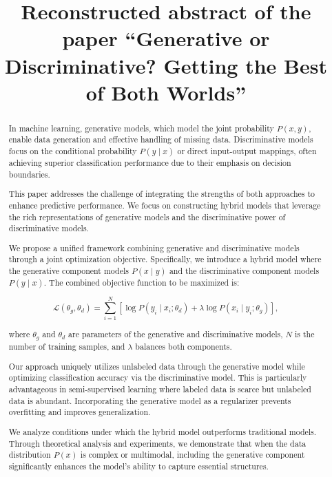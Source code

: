 \documentclass[12pt]{article}
\begin{document}
\title{Reconstructed abstract of the paper ``Generative or Discriminative? Getting the Best of Both Worlds''}
\author{}
\date{}

\maketitle

\begin{abstract}
In machine learning, generative models, which model the joint probability \( P(x, y) \), enable data generation and effective handling of missing data. Discriminative models focus on the conditional probability \( P(y \mid x) \) or direct input-output mappings, often achieving superior classification performance due to their emphasis on decision boundaries.

This paper addresses the challenge of integrating the strengths of both approaches to enhance predictive performance. We focus on constructing hybrid models that leverage the rich representations of generative models and the discriminative power of discriminative models.

We propose a unified framework combining generative and discriminative models through a joint optimization objective. Specifically, we introduce a hybrid model where the generative component models \( P(x \mid y) \) and the discriminative component models \( P(y \mid x) \). The combined objective function to be maximized is:

\[
\mathcal{L}(\theta_g, \theta_d) = \sum_{i=1}^{N} \left[ \log P(y_i \mid x_i; \theta_d) + \lambda \log P(x_i \mid y_i; \theta_g) \right],
\]

where \( \theta_g \) and \( \theta_d \) are parameters of the generative and discriminative models, \( N \) is the number of training samples, and \( \lambda \) balances both components.

Our approach uniquely utilizes unlabeled data through the generative model while optimizing classification accuracy via the discriminative model. This is particularly advantageous in semi-supervised learning where labeled data is scarce but unlabeled data is abundant. Incorporating the generative model as a regularizer prevents overfitting and improves generalization.

We analyze conditions under which the hybrid model outperforms traditional models. Through theoretical analysis and experiments, we demonstrate that when the data distribution \( P(x) \) is complex or multimodal, including the generative component significantly enhances the model's ability to capture essential structures.


\end{abstract}
\end{document}
